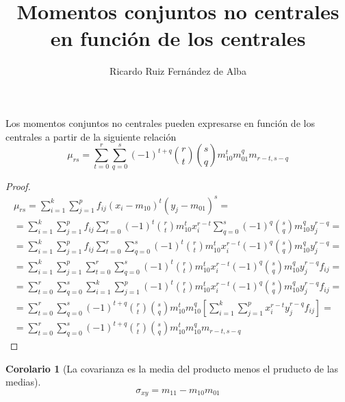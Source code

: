 \documentclass[a4paper , 11pt, spanish ]{article}
\title{Momentos conjuntos no centrales en función de los centrales}
\author{Ricardo Ruiz Fernández de Alba}
\theoremstyle{definition}
\newtheorem{corollary}{Corolario}[theorem]
\begin{document}
\maketitle

\begin{theorem}
Los momentos conjuntos no centrales pueden expresarse en función de los
centrales a partir de la siguiente relación
$$
\mu_{rs} = \sum_{t=0}^r \sum _{q=0}^s
    (-1)^{t+q} \binom{r}{t} \binom{s}{q} m_{10}^t m_{01}^q m_{r-t,s-q}
$$
\end{theorem}

\begin{proof}
\begin{align*}
\mu_{rs} = \sum_{i=1}^k \sum_{j=1}^p f_{ij} (x_i - m_{10})^t (y_j - m_{01})^s = \\
= \sum_{i=1}^k \sum_{j=1}^p f_{ij}
            \sum_{t=0}^r (-1)^t \binom{r}{t} m_{10}^t x_i^{r-t}
            \sum_{q=0}^s (-1)^q \binom{s}{q} m_{10}^q y_j^{r-q}  = \\
= \sum_{i=1}^k \sum_{j=1}^p f_{ij}
            \sum_{t=0}^r \sum_{q=0}^s
            (-1)^t \binom{r}{t} m_{10}^t x_i^{r-t}
            (-1)^q \binom{s}{q} m_{10}^q y_j^{r-q}  = \\
= \sum_{i=1}^k \sum_{j=1}^p  \sum_{t=0}^r \sum_{q=0}^s
            (-1)^t \binom{r}{t} m_{10}^t x_i^{r-t}
            (-1)^q \binom{s}{q} m_{10}^q y_j^{r-q}
            f_{ij} = \\
= \sum_{t=0}^r \sum_{q=0}^s \sum_{i=1}^k \sum_{j=1}^p
            (-1)^t \binom{r}{t} m_{10}^t x_i^{r-t}
            (-1)^q \binom{s}{q} m_{10}^q y_j^{r-q}
            f_{ij} = \\
= \sum_{t=0}^r \sum_{q=0}^s
          (-1)^{t+q} \binom{r}{t} \binom{s}{q} m_{10}^t m_{10}^q
          \left[\sum_{i=1}^k \sum_{j=1}^p x_i^{r-t} y_j^{r-q} f_{ij}\right] = \\
= \sum_{t=0}^r \sum_{q=0}^s
          (-1)^{t+q} \binom{r}{t} \binom{s}{q} m_{10}^t m_{10}^q m_{r-t,s-q}
\end{align*}
\end{proof}

\newpage
\begin{corollary}[La covarianza es la media del producto menos el pruducto de las medias]
$$
\sigma_{xy} = m_{11} - m_{10}m_{01}
$$
\end{corollary}
\end{document}
